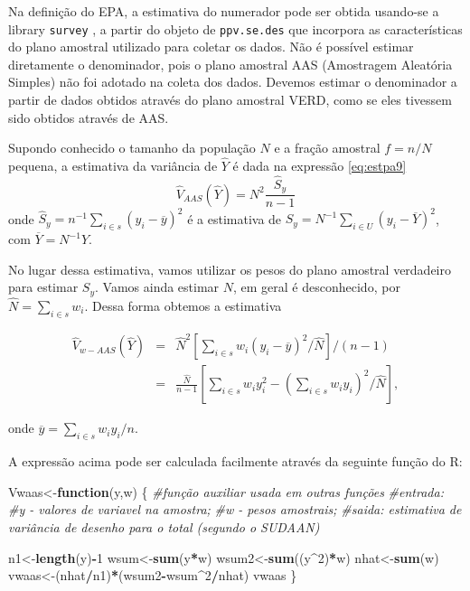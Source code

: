 \documentclass[]{book}
\newenvironment{Shaded}{\begin{snugshade}}{\end{snugshade}}
\newcommand{\KeywordTok}[1]{\textcolor[rgb]{0.13,0.29,0.53}{\textbf{#1}}}
\newcommand{\DecValTok}[1]{\textcolor[rgb]{0.00,0.00,0.81}{#1}}
\newcommand{\CommentTok}[1]{\textcolor[rgb]{0.56,0.35,0.01}{\textit{#1}}}
\newcommand{\ControlFlowTok}[1]{\textcolor[rgb]{0.13,0.29,0.53}{\textbf{#1}}}
\newcommand{\OperatorTok}[1]{\textcolor[rgb]{0.81,0.36,0.00}{\textbf{#1}}}
\newcommand{\NormalTok}[1]{#1}
\theoremstyle{definition}
\theoremstyle{definition}
\theoremstyle{definition}
\theoremstyle{remark}
\begin{document}
Na definição do EPA, a estimativa do numerador pode ser obtida usando-se
a library \texttt{survey} \citep{R-survey}, a partir do objeto de
\texttt{ppv.se.des} que incorpora as características do plano amostral
utilizado para coletar os dados. Não é possível estimar diretamente o
denominador, pois o plano amostral AAS (Amostragem Aleatória Simples)
não foi adotado na coleta dos dados. Devemos estimar o denominador a
partir de dados obtidos através do plano amostral VERD, como se eles
tivessem sido obtidos através de AAS.

Supondo conhecido o tamanho da população \(N\) e a fração amostral
\(f=n/N\) pequena, a estimativa da variância de \(\widehat{Y}\) é dada
na expressão \eqref{eq:estpa9} \[
\widehat{V}_{AAS}\left(\widehat{Y}\right)=N^2\frac{\widehat{S}_y}{n-1}
\] onde
\(\widehat{S}_y= n^{-1}\sum_{i\in s}\left(y_i-\overline{y}\right)^2\) é
a estimativa de
\(S_y=N^{-1}\sum_{i\in U}\left(y_i-\overline{Y}\right)^2\), com
\(\overline{Y}=N^{-1}Y\).

No lugar dessa estimativa, vamos utilizar os pesos do plano amostral
verdadeiro para estimar \(S_y\). Vamos ainda estimar \(N\), em geral é
desconhecido, por \(\widehat{N}=\sum_{i \in s} w_i\). Dessa forma
obtemos a estimativa

\begin{eqnarray*}
\widehat{V}_{w-AAS}\left(\widehat{Y}\right)&=& \widehat{N}^2\left[\sum_{i \in s}w_i\left(y_i-\overline{y}\right)^2/\widehat{N}\right]/(n-1)\\
&=&\frac{\widehat{N}}{n-1}\left[\sum_{i \in s}w_iy_i^2-\left(\sum_{i \in s}w_iy_i\right)^2/\widehat{N}\right],
\end{eqnarray*}

onde \(\overline{y}=\sum_{i \in s}w_iy_i/n\).

A expressão acima pode ser calculada facilmente através da seguinte
função do R:

\begin{Shaded}
\begin{Highlighting}[]
\NormalTok{Vwaas<-}\ControlFlowTok{function}\NormalTok{(y,w)}
\NormalTok{\{}
\CommentTok{#função auxiliar usada em outras funções}
\CommentTok{#entrada:}
\CommentTok{#y - valores de variavel na amostra;}
\CommentTok{#w - pesos amostrais;}
\CommentTok{#saida:  estimativa de variância de desenho para o total (segundo o SUDAAN)}

\NormalTok{n1<-}\KeywordTok{length}\NormalTok{(y)}\OperatorTok{-}\DecValTok{1}
\NormalTok{wsum<-}\KeywordTok{sum}\NormalTok{(y}\OperatorTok{*}\NormalTok{w)}
\NormalTok{wsum2<-}\KeywordTok{sum}\NormalTok{((y}\OperatorTok{^}\DecValTok{2}\NormalTok{)}\OperatorTok{*}\NormalTok{w)}
\NormalTok{nhat<-}\KeywordTok{sum}\NormalTok{(w)}
\NormalTok{vwaas<-(nhat}\OperatorTok{/}\NormalTok{n1)}\OperatorTok{*}\NormalTok{(wsum2}\OperatorTok{-}\NormalTok{wsum}\OperatorTok{^}\DecValTok{2}\OperatorTok{/}\NormalTok{nhat)}
\NormalTok{vwaas}
\NormalTok{\}}
\end{Highlighting}
\end{Shaded}
\end{document}
